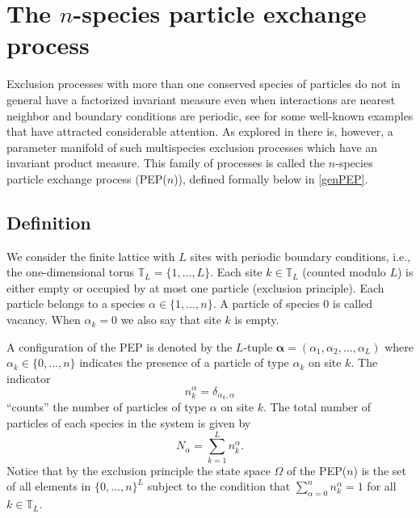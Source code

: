 \documentclass[12pt]{article}
\newcommand{\T}{{\mathbb T}} %
\newcommand{\balpha}{\boldsymbol{\alpha}}
\begin{document}
\section{The $n$-species particle exchange process}
\label{PEP}
\setcounter{equation}{0}
\setcounter{footnote}{0}

Exclusion processes with more than one conserved species of particles
do not in general have a factorized invariant measure even
when interactions are nearest neighbor and boundary conditions 
are periodic, see \cite{Derr93b,Evan98b,Isae01,Ferr13} for some
well-known examples that have attracted considerable attention.
As explored in \cite{Schu17} there is, however, a parameter
manifold of such multispecies exclusion processes which have
an invariant product measure. This family of processes is called
the $n$-species particle exchange process (PEP($n$)), defined
formally below in \eqref{genPEP}.


\subsection{Definition}

We consider the finite lattice with $L$ sites
with periodic boundary conditions, i.e., the one-dimensional
torus $\T_L = \{1,\dots,L\}$. Each site $k\in\T_L$ (counted
modulo $L$) is either empty or occupied by at most one particle
(exclusion principle).
Each particle belongs to a species $\alpha\in\{1,\dots,n\}$.
A particle of species 0 is called vacancy. When $\alpha_{k}=0$ 
we also say that site $k$ is empty. 

A configuration of the PEP is denoted
by the $L$-tuple $\balpha=(\alpha_{1},\alpha_{2},\dots,
\alpha_{L})$ where $\alpha_{k}\in\{0,\dots,n\}$
indicates the presence of a particle of type $\alpha_k$ on site $k$.
The indicator
\begin{equation}
n^{\alpha}_{k} = \delta_{\alpha_{k},\alpha}
\end{equation}
``counts'' the number of particles of type $\alpha$ on site $k$.
The total number of particles of each species 
in the system is given by
\begin{equation}
N_{\alpha} = \sum_{k=1}^{L} n^{\alpha}_{k} .
\label{partnum}
\end{equation}
Notice that by the exclusion principle the state space $\Omega$ 
of the PEP($n$) is the set of
all elements in $\{0,\dots,n\}^L$ subject to the condition that
$\sum_{\alpha=0}^n n^{\alpha}_{k}=1$
for all $k\in\T_L$.
\end{document}
